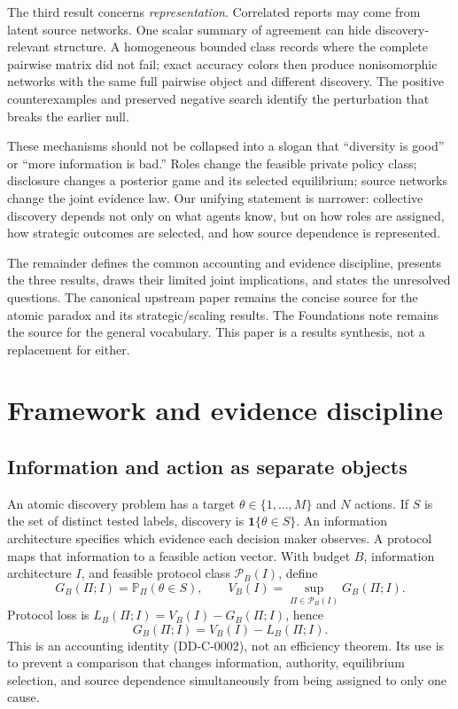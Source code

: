 \documentclass[11pt]{article}
\theoremstyle{remark}
\newcommand{\Prob}{\mathbb{P}}
\begin{document}
The third result concerns \emph{representation}. Correlated reports may come from
latent source networks. One scalar summary of agreement can hide discovery-
relevant structure. A homogeneous bounded class records where the complete
pairwise matrix did not fail; exact accuracy colors then produce nonisomorphic
networks with the same full pairwise object and different discovery. The positive
counterexamples and preserved negative search identify the perturbation that
breaks the earlier null.

These mechanisms should not be collapsed into a slogan that ``diversity is good''
or ``more information is bad.'' Roles change the feasible private policy class;
disclosure changes a posterior game and its selected equilibrium; source networks
change the joint evidence law. Our unifying statement is narrower: collective
discovery depends not only on what agents know, but on how roles are assigned, how
strategic outcomes are selected, and how source dependence is represented.

The remainder defines the common accounting and evidence discipline, presents the
three results, draws their limited joint implications, and states the unresolved
questions. The canonical upstream paper remains the concise source for the atomic
paradox and its strategic/scaling results. The Foundations note remains the source
for the general vocabulary. This paper is a results synthesis, not a replacement
for either.

\section{Framework and evidence discipline}
\subsection{Information and action as separate objects}

An atomic discovery problem has a target $\theta\in\{1,\ldots,M\}$ and $N$
actions. If $S$ is the set of distinct tested labels, discovery is
$\mathbf 1\{\theta\in S\}$. An information architecture specifies which evidence
each decision maker observes. A protocol maps that information to a feasible
action vector. With budget $B$, information architecture $I$, and feasible
protocol class $\mathcal P_B(I)$, define
\[
G_B(\Pi;I)=\Prob_\Pi(\theta\in S),\qquad
V_B(I)=\sup_{\Pi\in\mathcal P_B(I)}G_B(\Pi;I).
\]
Protocol loss is $L_B(\Pi;I)=V_B(I)-G_B(\Pi;I)$, hence
\[
G_B(\Pi;I)=V_B(I)-L_B(\Pi;I).
\]
This is an accounting identity (DD-C-0002), not an efficiency theorem. Its use is
to prevent a comparison that changes information, authority, equilibrium
selection, and source dependence simultaneously from being assigned to only one
cause.
\end{document}
